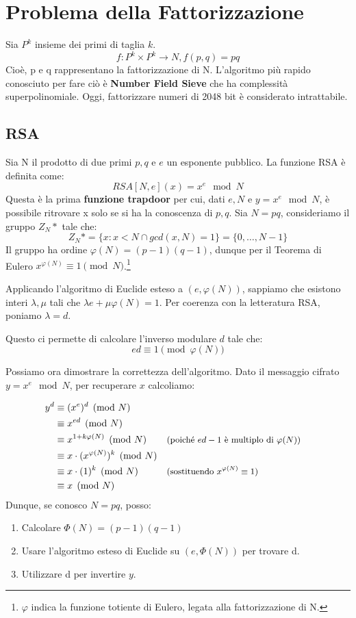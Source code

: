 \section{Problema della Fattorizzazione}
Sia $P^k$ insieme dei primi di taglia $k$.
\[f:P^k \times P^k \rightarrow N, f(p,q)=pq\]
Cioè, p e q rappresentano la fattorizzazione di N. L'algoritmo più rapido conosciuto per fare ciò è \textbf{Number Field Sieve} che ha complessità superpolinomiale. Oggi, fattorizzare numeri di 2048 bit è considerato intrattabile.
\subsection{RSA}
Sia N il prodotto di due primi $p,q$ e $e$ un esponente pubblico. La funzione RSA è definita come:
\[RSA[N, e](x) = x^e \mod N\]
Questa è la prima \textbf{funzione trapdoor} per cui, dati $e,N$ e $y =x^e \mod N$, è possibile ritrovare x solo se si ha la conoscenza di $p,q$.
Sia $N=pq$, consideriamo il gruppo $Z_N*$ tale che: 
\[Z_N* = \{x: x<N \cap gcd(x,N)=1\}=\{0,\dots,N-1\}\]
Il gruppo ha ordine $\varphi(N)= (p-1)(q-1)$, dunque per il Teorema di Eulero $x^{\varphi(N)} \equiv 1 \pmod N$.\footnote{$\varphi$ indica la funzione totiente di Eulero, legata alla fattorizzazione di N.}

Applicando l'algoritmo di Euclide esteso a $(e, \varphi(N))$, sappiamo che esistono interi $\lambda,\mu$ tali che $\lambda e + \mu \varphi(N)=1$. Per coerenza con la letteratura RSA, poniamo $\lambda = d$.

Questo ci permette di calcolare l'inverso modulare $d$ tale che:
\[ ed \equiv 1 \pmod{\varphi(N)} \]

Possiamo ora dimostrare la correttezza dell'algoritmo.
Dato il messaggio cifrato $y = x^e \mod N$, per recuperare $x$ calcoliamo:

\begin{align*}
    y^d &\equiv (x^e)^d \pmod N \\
    &\equiv x^{ed} \pmod N \\
    &\equiv x^{1+k\varphi(N)} \pmod N && \text{\small(poiché $ed - 1$ è multiplo di $\varphi(N)$)}\\
    &\equiv x \cdot (x^{\varphi(N)})^k \pmod N \\
    &\equiv x \cdot (1)^k \pmod N && \text{\small(sostituendo $x^{\varphi(N)} \equiv 1$)}\\
    &\equiv x \pmod N
\end{align*}
Dunque, se conosco $N=pq$, posso:
\begin{enumerate}
    \item Calcolare $\Phi(N) = (p-1)(q-1)$
    \item Usare l'algoritmo esteso di Euclide su $(e, \Phi(N))$ per trovare d. 
    \item Utilizzare d per invertire $y$.
\end{enumerate}

